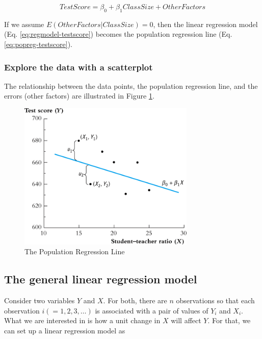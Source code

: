 \documentclass[a4paper,11pt]{article}
\begin{document}
\begin{equation}
\label{eq:regmodel-testscore}
TestScore = \beta_0 + \beta_1 ClassSize + OtherFactors
\end{equation}

If we assume \(E(OtherFactors | ClassSize) = 0\), then the linear
regression model (Eq. \ref{eq:regmodel-testscore}) becomes the population
regression line (Eq. \ref{eq:popreg-testscore}).

\subsubsection*{Explore the data with a scatterplot}
\label{sec:org64b3076}

The relationship between the data points, the population regression
line, and the errors (other factors) are illustrated in Figure \ref{fig:org3619567}.

\begin{figure}[htbp]
\centering
\includegraphics[width=0.75\textwidth]{img/fig-4-1.png}
\caption{\label{fig:org3619567}
The Population Regression Line}
\end{figure}

\subsection{The general linear regression model}
\label{sec:orgf451fff}

Consider two variables \(Y\) and \(X\). For both, there are \(n\)
observations so that each observation \(i (=1, 2, 3, \ldots)\) is
associated with a pair of values of \(Y_i\) and \(X_i\). What we are
interested in is how a unit change in \(X\) will affect \(Y\). For that,
we can set up a linear regression model as
\end{document}
